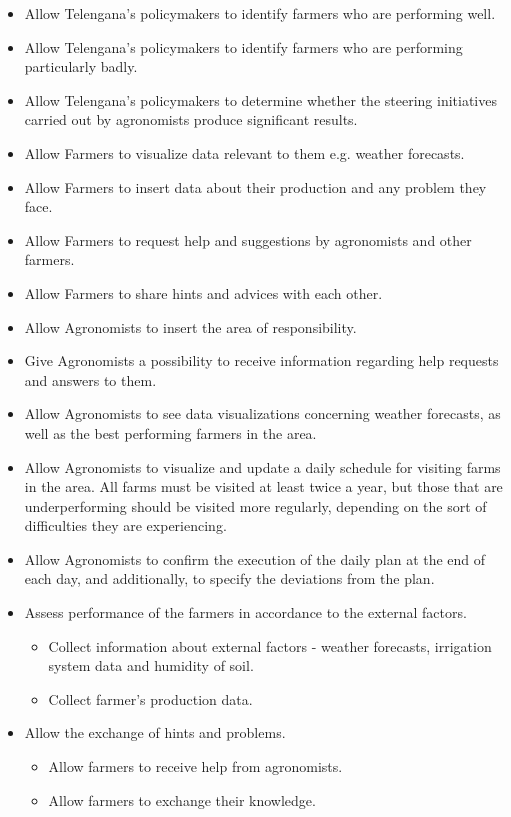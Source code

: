 \begin{itemize}
    \item Allow Telengana's policymakers to identify farmers who are performing well.
    \item Allow Telengana's policymakers to identify farmers who are performing particularly badly.
    \item Allow Telengana's policymakers to determine whether the steering initiatives carried out by agronomists produce significant results.
    \item Allow Farmers to visualize data relevant to them e.g. weather forecasts.
    \item Allow Farmers to insert data about their production and any problem they face.
    \item Allow Farmers to request help and suggestions by agronomists and other farmers.
    \item Allow Farmers to share hints and advices with each other.
    \item Allow Agronomists to insert the area of responsibility.
    \item Give Agronomists a possibility to receive information regarding help requests and answers to them.
    \item Allow Agronomists to see data visualizations concerning weather forecasts, as well as the best performing farmers in the area.
    \item Allow Agronomists to visualize and update a daily schedule for visiting farms in the area. All farms must be visited at least twice a year, but those that are underperforming should be visited more regularly, depending on the sort of difficulties they are experiencing.
    \item Allow Agronomists to confirm the execution of the daily plan at the end of each day, and additionally, to specify the deviations from the plan.
    
    \item Assess performance of the farmers in accordance to the external factors.
    \begin{itemize}
        \item Collect information about external factors - weather forecasts, irrigation system data and humidity of soil.
        \item Collect farmer's production data.
    \end{itemize}
    \item Allow the exchange of hints and problems.
    \begin{itemize}
        \item Allow farmers to receive help from agronomists.
        \item Allow farmers to exchange their knowledge.
    \end{itemize}
    

\end{itemize}
